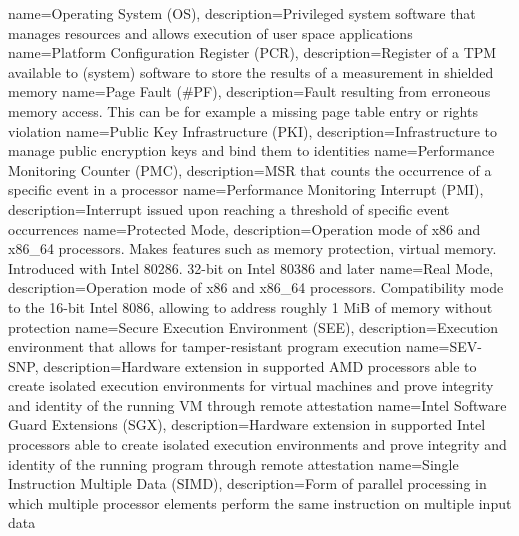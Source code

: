 {
  name=Operating System (OS),
  description={Privileged system software that manages resources and allows execution of user space applications}
}
%
{
  name=Platform Configuration Register (PCR),
  description={Register of a TPM available to (system) software to store the results of a measurement in shielded
  memory}
}
{
  name=Page Fault (\#PF),
  description={Fault resulting from erroneous memory access. This can be for example a missing page table entry or
  rights violation}
}
{
  name=Public Key Infrastructure (PKI),
  description={Infrastructure to manage public encryption keys and bind them to identities}
}
{
  name=Performance Monitoring Counter (PMC),
  description={MSR that counts the occurrence of a specific event in a processor}
}
{
  name=Performance Monitoring Interrupt (PMI),
  description={Interrupt issued upon reaching a threshold of specific event occurrences}
}
{
  name=Protected Mode,
  description={Operation mode of x86 and x86\_64 processors. Makes features such as memory protection, virtual memory.
  Introduced with Intel 80286. 32-bit on Intel 80386 and later}
}
%
{
  name=Real Mode,
  description={Operation mode of x86 and x86\_64 processors. Compatibility mode to the 16-bit Intel 8086, allowing to
  address roughly 1 MiB of memory without protection}
}
%
{
  name=Secure Execution Environment (SEE),
  description={Execution environment that allows for tamper-resistant program execution}
}
{
  name=SEV-SNP,
  description={Hardware extension in supported AMD processors able to create isolated execution environments for
  virtual machines and prove integrity and identity of the running VM through remote attestation}
}
{
  name=Intel Software Guard Extensions (SGX),
  description={Hardware extension in supported Intel processors able to create isolated execution environments and
  prove integrity and identity of the running program through remote attestation}
}
{
  name=Single Instruction Multiple Data (SIMD),
  description={Form of parallel processing in which multiple processor elements perform the same instruction on
  multiple input data}
}
